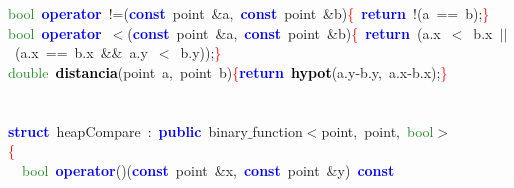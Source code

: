 \mbox{}\textcolor{ForestGreen}{bool}\ \textbf{\textcolor{Blue}{operator}}\ \textcolor{BrickRed}{!=(}\textbf{\textcolor{Blue}{const}}\ point\ \textcolor{BrickRed}{\&}a\textcolor{BrickRed}{,}\ \textbf{\textcolor{Blue}{const}}\ point\ \textcolor{BrickRed}{\&}b\textcolor{BrickRed}{)}\textcolor{Red}{\{}\ \textbf{\textcolor{Blue}{return}}\ \textcolor{BrickRed}{!(}a\ \textcolor{BrickRed}{==}\ b\textcolor{BrickRed}{);}\textcolor{Red}{\}} \\
\mbox{}\textcolor{ForestGreen}{bool}\ \textbf{\textcolor{Blue}{operator}}\ \textcolor{BrickRed}{$<$(}\textbf{\textcolor{Blue}{const}}\ point\ \textcolor{BrickRed}{\&}a\textcolor{BrickRed}{,}\ \textbf{\textcolor{Blue}{const}}\ point\ \textcolor{BrickRed}{\&}b\textcolor{BrickRed}{)}\textcolor{Red}{\{}\ \textbf{\textcolor{Blue}{return}}\ \textcolor{BrickRed}{(}a\textcolor{BrickRed}{.}x\ \textcolor{BrickRed}{$<$}\ b\textcolor{BrickRed}{.}x\ \textcolor{BrickRed}{$|$$|$}\ \textcolor{BrickRed}{(}a\textcolor{BrickRed}{.}x\ \textcolor{BrickRed}{==}\ b\textcolor{BrickRed}{.}x\ \textcolor{BrickRed}{\&\&}\ a\textcolor{BrickRed}{.}y\ \textcolor{BrickRed}{$<$}\ b\textcolor{BrickRed}{.}y\textcolor{BrickRed}{));}\textcolor{Red}{\}} \\
\mbox{}\textcolor{ForestGreen}{double}\ \textbf{\textcolor{Black}{distancia}}\textcolor{BrickRed}{(}point\ a\textcolor{BrickRed}{,}\ point\ b\textcolor{BrickRed}{)}\textcolor{Red}{\{}\textbf{\textcolor{Blue}{return}}\ \textbf{\textcolor{Black}{hypot}}\textcolor{BrickRed}{(}a\textcolor{BrickRed}{.}y\textcolor{BrickRed}{-}b\textcolor{BrickRed}{.}y\textcolor{BrickRed}{,}\ a\textcolor{BrickRed}{.}x\textcolor{BrickRed}{-}b\textcolor{BrickRed}{.}x\textcolor{BrickRed}{);}\textcolor{Red}{\}} \\
\mbox{} \\
\mbox{} \\
\mbox{}\textbf{\textcolor{Blue}{struct}}\ heapCompare\ \textcolor{BrickRed}{:}\ \textbf{\textcolor{Blue}{public}}\ binary$\_$function\textcolor{BrickRed}{$<$}point\textcolor{BrickRed}{,}\ point\textcolor{BrickRed}{,}\ \textcolor{ForestGreen}{bool}\textcolor{BrickRed}{$>$} \\
\mbox{}\textcolor{Red}{\{} \\
\mbox{}\ \ \textcolor{ForestGreen}{bool}\ \textbf{\textcolor{Blue}{operator}}\textcolor{BrickRed}{()(}\textbf{\textcolor{Blue}{const}}\ point\ \textcolor{BrickRed}{\&}x\textcolor{BrickRed}{,}\ \textbf{\textcolor{Blue}{const}}\ point\ \textcolor{BrickRed}{\&}y\textcolor{BrickRed}{)}\ \textbf{\textcolor{Blue}{const}} \\
